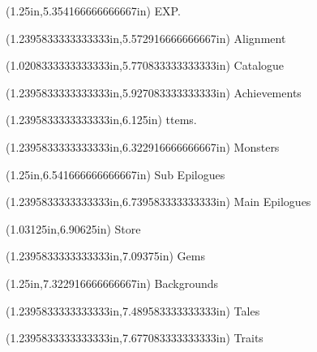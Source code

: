 \documentclass{article}
\begin{document}
\begin{textblock*}{8.0in}(1.25in,5.354166666666667in)
\fontsize{10.50}{12.60}\selectfont
EXP.
\end{textblock*}
\begin{textblock*}{8.0in}(1.2395833333333333in,5.572916666666667in)
\fontsize{12.75}{15.30}\selectfont
Alignment
\end{textblock*}
\begin{textblock*}{8.0in}(1.0208333333333333in,5.770833333333333in)
\fontsize{12.75}{15.30}\selectfont
Catalogue
\end{textblock*}
\begin{textblock*}{8.0in}(1.2395833333333333in,5.927083333333333in)
\fontsize{10.50}{12.60}\selectfont
Achievements
\end{textblock*}
\begin{textblock*}{8.0in}(1.2395833333333333in,6.125in)
\fontsize{10.50}{12.60}\selectfont
ttems.
\end{textblock*}
\begin{textblock*}{8.0in}(1.2395833333333333in,6.322916666666667in)
\fontsize{10.50}{12.60}\selectfont
Monsters
\end{textblock*}
\begin{textblock*}{8.0in}(1.25in,6.541666666666667in)
\fontsize{12.75}{15.30}\selectfont
Sub Epilogues
\end{textblock*}
\begin{textblock*}{8.0in}(1.2395833333333333in,6.739583333333333in)
\fontsize{12.75}{15.30}\selectfont
Main Epilogues
\end{textblock*}
\begin{textblock*}{8.0in}(1.03125in,6.90625in)
\fontsize{10.50}{12.60}\selectfont
Store
\end{textblock*}
\begin{textblock*}{8.0in}(1.2395833333333333in,7.09375in)
\fontsize{10.50}{12.60}\selectfont
Gems
\end{textblock*}
\begin{textblock*}{8.0in}(1.25in,7.322916666666667in)
\fontsize{12.75}{15.30}\selectfont
Backgrounds
\end{textblock*}
\begin{textblock*}{8.0in}(1.2395833333333333in,7.489583333333333in)
\fontsize{10.50}{12.60}\selectfont
Tales
\end{textblock*}
\begin{textblock*}{8.0in}(1.2395833333333333in,7.677083333333333in)
\fontsize{10.50}{12.60}\selectfont
Traits
\end{textblock*}
\end{document}
